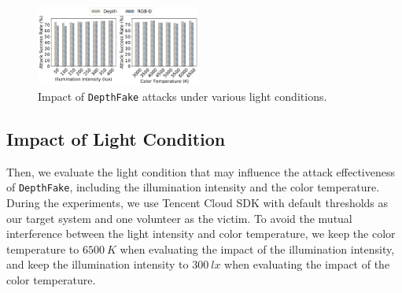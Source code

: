 %

\begin{figure}[pt]
	\centerline{\includegraphics[width = 0.48\textwidth]{figures/light_condition.pdf}}
	\vspace{-0.15in}
	\caption{Impact of \texttt{DepthFake} attacks under various light conditions.}
	\label{light_condition}
	\vspace{-0.1in}
\end{figure}

\subsection{Impact of Light Condition}

Then, we evaluate the light condition that may influence the attack effectiveness of \texttt{DepthFake}, including the illumination intensity and the color temperature. During the experiments, we use Tencent Cloud SDK with default thresholds as our target system and one volunteer as the victim.  
To avoid the mutual interference between the light intensity and color temperature, we keep the color temperature to $6500~K$ when evaluating the impact of the illumination intensity, and keep the illumination intensity to $300~lx$ when evaluating the impact of the color temperature.

